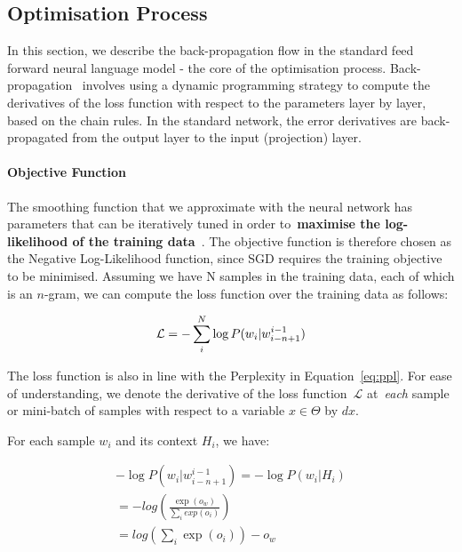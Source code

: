 \subsection{Optimisation Process}
In this section, we describe the back-propagation flow in the standard feed forward neural language model - the core of the optimisation process. Back-propagation~\cite{rumelhart1985learning} involves using a dynamic programming strategy to compute the derivatives of the loss function with respect to the parameters layer by layer, based on the chain rules. In the standard network, the error derivatives are back-propagated from the output layer to the input (projection) layer.

\paragraph{Objective Function}


The smoothing function that we approximate with the neural network has parameters that can be iteratively tuned in order to~\textbf{maximise the log-likelihood of the training data}~\cite{bengio2003neural}. The objective function is therefore chosen as the Negative Log-Likelihood function, since SGD requires the training objective to be minimised. Assuming we have N samples in the training data, each of which is an $n$-gram, we can compute the loss function over the training data as follows:

\begin{equation}
\mathcal{L} = - 	\sum_{i}^N \log P( w_i | w_{i-n+1}^{i-1} ) \\
\label{eq:objective}
\end{equation}

The loss function is also in line with the Perplexity in Equation~\ref{eq:ppl}. For ease of understanding, we denote the derivative of the loss function~$\mathcal{L}$ at~\textit{each} sample or mini-batch of samples with respect to a variable $x \in \Theta$ by $dx$.  

For each sample $w_i$ and its context $H_i$, we have:

\begin{equation}
\begin{aligned}
- \log P(w_i |  w_{i-n+1}^{i-1})  = - \log P(w_i | H_i) \\
= - log (\frac{\exp (o_w)}{\sum_i exp(o_i)}) \\
=  log(\sum_i \exp(o_i)) - o_w
\label{eq:objective2}
\end{aligned}
\end{equation}

